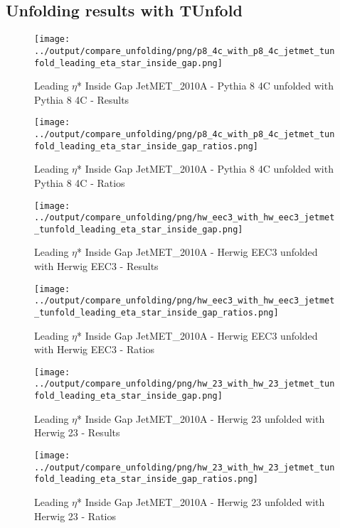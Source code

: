 \documentclass[11pt]{book}
\begin{document}
\clearpage
\subsection{Unfolding results with TUnfold}

\begin{figure}[ht]
\centering
\texttt{[image: ../output/compare\_unfolding/png/p8\_4c\_with\_p8\_4c\_jetmet\_tunfold\_leading\_eta\_star\_inside\_gap.png]}
\caption{Leading $\eta$* Inside Gap JetMET\_2010A - Pythia 8 4C unfolded with Pythia 8 4C - Results}
\label{p8_p8_jetmet_tunfold_leading_eta_star_inside_gap_a}
\end{figure}

\begin{figure}[ht]
\centering
\texttt{[image: ../output/compare\_unfolding/png/p8\_4c\_with\_p8\_4c\_jetmet\_tunfold\_leading\_eta\_star\_inside\_gap\_ratios.png]}
\caption{Leading $\eta$* Inside Gap JetMET\_2010A - Pythia 8 4C unfolded with Pythia 8 4C - Ratios}
\label{p8_p8_jetmet_tunfold_leading_eta_star_inside_gap_b}
\end{figure}

\begin{figure}[ht]
\centering
\texttt{[image: ../output/compare\_unfolding/png/hw\_eec3\_with\_hw\_eec3\_jetmet\_tunfold\_leading\_eta\_star\_inside\_gap.png]}
\caption{Leading $\eta$* Inside Gap JetMET\_2010A - Herwig EEC3 unfolded with Herwig EEC3 - Results}
\label{hw_eec3_hw_eec3_jetmet_tunfold_leading_eta_star_inside_gap_a}
\end{figure}

\begin{figure}[ht]
\centering
\texttt{[image: ../output/compare\_unfolding/png/hw\_eec3\_with\_hw\_eec3\_jetmet\_tunfold\_leading\_eta\_star\_inside\_gap\_ratios.png]}
\caption{Leading $\eta$* Inside Gap JetMET\_2010A - Herwig EEC3 unfolded with Herwig EEC3 - Ratios}
\label{hw_eec3_hw_eec3_jetmet_tunfold_leading_eta_star_inside_gap_b}
\end{figure}

\begin{figure}[ht]
\centering
\texttt{[image: ../output/compare\_unfolding/png/hw\_23\_with\_hw\_23\_jetmet\_tunfold\_leading\_eta\_star\_inside\_gap.png]}
\caption{Leading $\eta$* Inside Gap JetMET\_2010A - Herwig 23 unfolded with Herwig 23 - Results}
\label{hw_23_hw_23_jetmet_tunfold_leading_eta_star_inside_gap_a}
\end{figure}

\begin{figure}[ht]
\centering
\texttt{[image: ../output/compare\_unfolding/png/hw\_23\_with\_hw\_23\_jetmet\_tunfold\_leading\_eta\_star\_inside\_gap\_ratios.png]}
\caption{Leading $\eta$* Inside Gap JetMET\_2010A - Herwig 23 unfolded with Herwig 23 - Ratios}
\label{hw_23_hw_23_jetmet_tunfold_leading_eta_star_inside_gap_b}
\end{figure}
\end{document}

